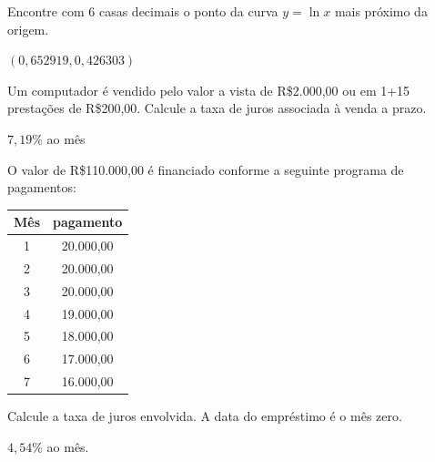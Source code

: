 \begin{Exercise} Encontre com 6 casas decimais o ponto da curva $y=\ln x$ mais próximo da origem.
\end{Exercise}
\begin{Answer}
  \begin{tiny}
$(0,652919, 0,426303)$    
  \end{tiny}
\end{Answer}


\begin{Exercise}[title= Matemática financeira] Um computador é vendido pelo valor a vista de R\$2.000,00 ou em 1+15 prestações de R\$200,00. Calcule a taxa de juros associada à venda a prazo.
\end{Exercise}

\begin{Answer}
  \begin{tiny}
$7,19$\% ao mês    
  \end{tiny}
\end{Answer}

\begin{Exercise}[title= Matemática financeira] O valor de R\$110.000,00 é financiado conforme a seguinte programa de pagamentos:

\begin{tabular}{|c|c|}
\hline
Mês & pagamento\\
\hline
1&20.000,00\\
2&20.000,00\\
3&20.000,00\\
4&19.000,00\\
5&18.000,00\\
6&17.000,00\\
7&16.000,00\\
\hline	
\end{tabular}

Calcule a taxa de juros envolvida. A data do empréstimo é o mês zero.
 \end{Exercise}

\begin{Answer}
  \begin{tiny}
$4,54$\% ao mês.    
  \end{tiny}
\end{Answer}


